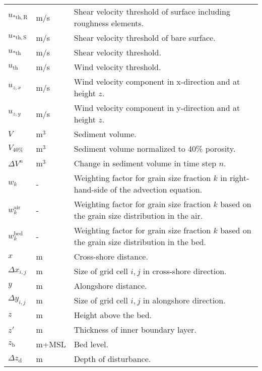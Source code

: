 \begin{longtable}{p{1cm} p{2cm} p{7.75cm}}
  $u_{\mathrm{*th,R}}$ & m/s & Shear velocity threshold of surface including roughness elements. \\
  $u_{\mathrm{*th,S}}$ & m/s & Shear velocity threshold of bare surface. \\
  $u_{\mathrm{*th}}$ & m/s & Shear velocity threshold. \\
  $u_{\mathrm{th}}$ & m/s & Wind velocity threshold. \\
  $u_{z,x}$ & m/s & Wind velocity component in x-direction and at height $z$. \\
  $u_{z,y}$ & m/s & Wind velocity component in y-direction and at height $z$. \\
  $V$ & $\mathrm{m^3}$ & Sediment volume. \\
  $V_{\mathrm{40\%}}$ & $\mathrm{m^3}$ & Sediment volume normalized to 40\% porosity. \\
  $\Delta V^n$ & $\mathrm{m^3}$ & Change in sediment volume in time step $n$. \\
  $w_k$ & - & Weighting factor for grain size fraction $k$ in right-hand-side of the advection equation. \\
  $w_k^{\mathrm{air}}$ & - & Weighting factor for grain size fraction $k$ based on the grain size distribution in the air. \\
  $w_k^{\mathrm{bed}}$ & - & Weighting factor for grain size fraction $k$ based on the grain size distribution in the bed. \\
  $x$ & m & Cross-shore distance. \\
  $\Delta x_{i,j}$ & m & Size of grid cell $i,j$ in cross-shore direction. \\
  $y$ & m & Alongshore distance. \\
  $\Delta y_{i,j}$ & m & Size of grid cell $i,j$ in alongshore direction. \\
  $z$ & m & Height above the bed. \\
  $z'$ & m & Thickness of inner boundary layer. \\
  $z_{\mathrm{b}}$ & m+MSL & Bed level. \\
  $\Delta z_{\mathrm{d}}$ & m & Depth of disturbance. \\
\end{longtable}

